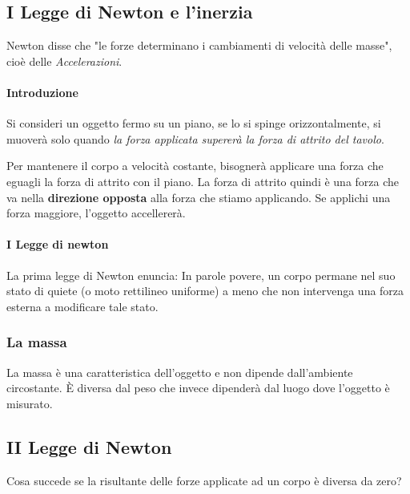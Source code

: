 \documentclass[12pt, a4paper, openany]{book}
\begin{document}
\subsection{I Legge di Newton e l'inerzia}
Newton disse che "le forze determinano i cambiamenti di velocità delle masse", cioè delle \emph{Accelerazioni}.
\paragraph*{Introduzione}
Si consideri un oggetto fermo su un piano, se lo si spinge orizzontalmente, si muoverà solo quando \emph{la forza applicata supererà la forza di attrito del tavolo}.

Per mantenere il corpo a velocità costante, bisognerà applicare una forza che eguagli la forza di attrito con il piano.
La forza di attrito quindi è una forza che va nella \textbf{direzione opposta} alla forza che stiamo applicando.
Se applichi una forza maggiore, l'oggetto accellererà.

\paragraph{I Legge di newton}
La prima legge di Newton enuncia:
In parole povere, un corpo permane nel suo stato di quiete (o moto rettilineo uniforme) a meno che non intervenga una forza esterna a modificare tale stato.

\subsubsection{La massa}
La massa è una caratteristica dell'oggetto e non dipende dall'ambiente circostante.
È diversa dal peso che invece dipenderà dal luogo dove l'oggetto è misurato.

\subsection{II Legge di Newton}
Cosa succede se la risultante delle forze applicate ad un corpo è diversa da zero?
\end{document}
